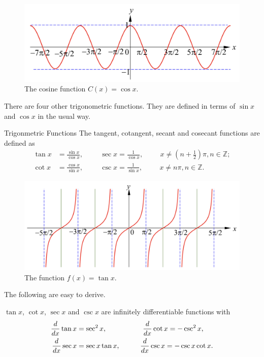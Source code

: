 \begin{figure}[ht]
\centering
\includegraphics[scale=0.2]{Picture33.png}
\caption{The cosine function $C(x)=\cos x$.\fa}\label{figure33}
\end{figure}

There are four other trigonometric functions. They are defined in terms of $\sin x$ and $\cos x$ in the usual way.
\begin{definition}{Trigonmetric Functions}
The tangent, cotangent, secant and cosecant functions are defined as
\begin{align*}
\tan x&=\frac{\sin x}{\cos x},\hspace{1cm}\sec x=\frac{1}{\cos x},\hspace{1cm} x\neq \left(n+\frac{1}{2}\right)\pi, n\in\mathbb{Z};\\
\cot x&=\frac{\cos x}{\sin x},\hspace{1cm}\csc x=\frac{1}{\sin x},\hspace{1cm} x\neq n\pi, n\in\mathbb{Z}.\end{align*}
\end{definition}


\begin{figure}[ht]
\centering
\includegraphics[scale=0.2]{Picture34.png}
\caption{The   function $f(x)=\tan x$.\fa}\label{figure34}
\end{figure}
The  following are easy to derive.
\begin{proposition}{}
$\tan x$, $\cot x$, $\sec x$ and $\csc x$ are infinitely differentiable functions with
\begin{align*}
\frac{d}{dx}\tan x&=\sec^2 x,\hspace{1.8cm} \frac{d}{dx}\cot x=-\csc^2x,\\
\frac{d}{dx}\sec x&=\sec x\tan x,\hspace{1cm}\frac{d}{dx}\csc x=-\csc x\cot x.
\end{align*}
\end{proposition}

